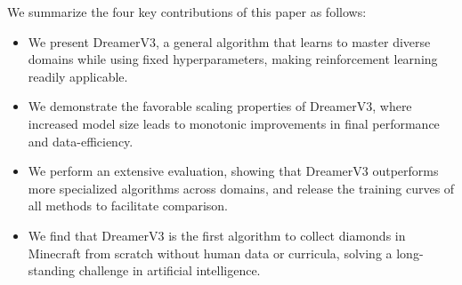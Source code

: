 We summarize the four key contributions of this paper as follows:
\begin{itemize}[topsep=-.5ex]
\setlength{\itemsep}{.2ex}
\setlength{\parskip}{0pt}
\item We present DreamerV3, a general algorithm that learns to master diverse domains while using fixed hyperparameters, making reinforcement learning readily applicable.
\item We demonstrate the favorable scaling properties of DreamerV3, where increased model size leads to monotonic improvements in final performance and data-efficiency.
\item We perform an extensive evaluation, showing that DreamerV3 outperforms more specialized algorithms across domains, and release the training curves of all methods to facilitate comparison.
\item We find that DreamerV3 is the first algorithm to collect diamonds in Minecraft from scratch without human data or curricula, solving a long-standing challenge in artificial intelligence.
\end{itemize}
